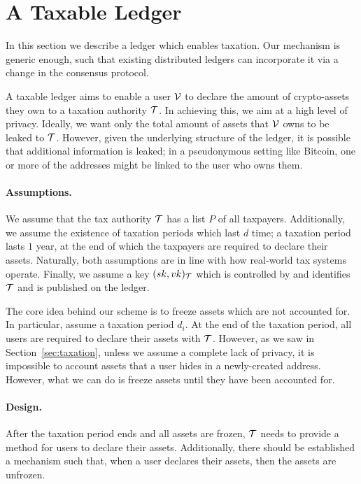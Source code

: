 \section{A Taxable Ledger}\label{sec:taxchain}

In this section we describe a ledger which enables taxation. Our mechanism is
generic enough, such that existing distributed ledgers can incorporate it via a
change in the consensus protocol.

A taxable ledger aims to enable a user $\mathcal{V}$ to declare the amount of
crypto-assets they own to a taxation authority $\mathcal{T}$. In achieving this,
we aim at a high level of privacy. Ideally, we want only the total amount of
assets that $\mathcal{V}$ owns to be leaked to $\mathcal{T}$. However, given the
underlying structure of the ledger, it is possible that additional information
is leaked; \eg in a pseudonymous setting like Bitcoin, one or more of the
addresses might be linked to the user who owns them.

\paragraph{Assumptions.}

We assume that the tax authority $\mathcal{T}$ has a list $P$ of all taxpayers.
Additionally, we assume the existence of taxation periods which last $d$ time;
\eg a taxation period lasts $1$ year, at the end of which the taxpayers are
required to declare their assets. Naturally, both assumptions are in line with
how real-world tax systems operate. Finally, we assume a key
$(sk, vk)_\mathcal{T}$ which is controlled by and identifies $\mathcal{T}$ and is
published on the ledger.

The core idea behind our scheme is to freeze assets which are not accounted
for. In particular, assume a taxation period $d_i$. At the end of the taxation
period, all users are required to declare their assets with $\mathcal{T}$.
However, as we saw in Section~\ref{sec:taxation}, unless we assume a complete
lack of privacy, it is impossible to account assets that a user hides in a
newly-created address. However, what we can do is freeze assets until they have
been accounted for.

\paragraph{Design.}

After the taxation period ends and all assets are frozen, $\mathcal{T}$ needs to
provide a method for users to declare their assets. Additionally, there should
be established a mechanism such that, when a user declares their assets, then
the assets are unfrozen.

